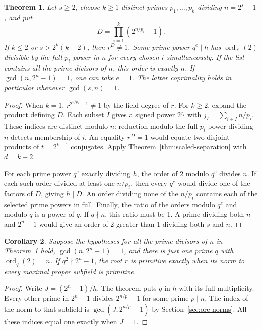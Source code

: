 \documentclass[11pt]{article}
\newtheorem{theorem}{Theorem}
\newtheorem{corollary}[theorem]{Corollary}
\begin{document}
\begin{theorem}\label{thm:ore-primitive-component}
Let \(s\ge2\), choose \(k\ge1\) distinct primes \(p_1,\ldots,p_k\) dividing
\(n=2^s-1\), and put
\[
 D=\prod_{i=1}^k(2^{n/p_i}-1).
\]
If \(k\le2\) or \(s>2^k(k-2)\), then \(r^D\ne1\).
Some prime power \(q^e\mid h\) has \(\operatorname{ord}_{q^e}(2)\) divisible
by the full \(p_i\)-power in \(n\) for every chosen \(i\) simultaneously.
If the list contains all the prime divisors of \(n\), this order is exactly \(n\).
If \(\gcd(n,2^n-1)=1\), one can take \(e=1\). The latter coprimality
holds in particular whenever \(\gcd(s,n)=1\).
\end{theorem}
\begin{proof}
When \(k=1\), \(r^{2^{n/p_1}-1}\ne1\) by the field degree of \(r\).
For \(k\ge2\), expand the product defining \(D\).
Each subset \(I\) gives a signed power \(2^{j_I}\) with
\(j_I=\sum_{i\in I}n/p_i\). These indices are distinct modulo
\(n\): reduction modulo the full \(p_i\)-power dividing \(n\)
detects membership of \(i\). An equality \(r^D=1\) would equate
two disjoint products of \(t=2^{k-1}\) conjugates. Apply
Theorem~\ref{thm:scaled-separation} with \(d=k-2\).

For each prime power \(q^e\) exactly dividing \(h\), the order
of 2 modulo \(q^e\) divides \(n\). If each such order divided at least one \(n/p_i\), then every
\(q^e\) would divide one of the factors of \(D\), giving \(h\mid D\).
An order dividing none of the \(n/p_i\) contains each of the selected
prime powers in full.
Finally, the ratio of the orders modulo \(q^e\) and modulo \(q\)
is a power of \(q\). If \(q\nmid n\), this ratio must be 1.
A prime dividing both \(n\) and \(2^n-1\) would give an order of
2 greater than 1 dividing both \(s\) and \(n\).
\end{proof}

\begin{corollary}
Suppose the hypotheses for all the prime divisors of \(n\) in
Theorem~\ref{thm:ore-primitive-component} hold, \(\gcd(n,2^n-1)=1\),
and there is just one prime \(q\) with \(\operatorname{ord}_q(2)=n\).
If \(q^2\nmid2^n-1\), the root \(r\) is primitive exactly when its
norm to every maximal proper subfield is primitive.
\end{corollary}
\begin{proof}
Write \(J=(2^n-1)/h\). The theorem puts \(q\) in \(h\) with its
full multiplicity. Every other prime in \(2^n-1\) divides
\(2^{n/p}-1\) for some prime \(p\mid n\). The index of the norm
to that subfield is \(\gcd(J,2^{n/p}-1)\) by
Section~\ref{sec:ore-norms}. All these indices equal one exactly
when \(J=1\).
\end{proof}
\end{document}
